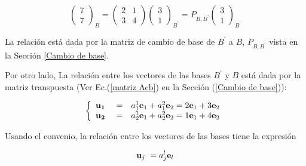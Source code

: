 \begin{example}
\bigskip



$$\left(\begin{array}{c} 7 \\ 7
 \end{array}
 \right)_B=\left(\begin{array}{cc} 2  & 1 \\ 3  &  4
\end{array}
 \right)
\left(\begin{array}{c} 3 \\ 1
 \end{array}
 \right)_{B^\prime}= P_{B,B ^{\prime}}\left(\begin{array}{c} 3 \\ 1
 \end{array}
 \right)_{B^\prime}$$

\bigskip




\bigskip

La relación está dada por la matriz de cambio de base de $B^\prime$ a $B$, $P_{B,B ^{\prime}}$ vista en la  Sección \ref{Cambio de base}.


\bigskip


Por otro lado,  La relación entre los vectores de las bases  $B^\prime$  y $B$ está dada por la matriz transpuesta  (Ver Ec.(\ref{matriz Acb}) en la Sección (\ref{Cambio de base})):



\begin{equation*} \label{rot}
\left\{ \begin{array} {ccl} 
                    \bold{u _1} &\ =&   a_{1}^1\bold{e}_1+a_{1}^2\bold{e}_2 =2\bold{e}_1+3\bold{e}_2   \\
                     \bold{u _2 } &\ = &a_{2}^1\bold{e}_1+ a_{2}^2\bold{e}_2 =1\bold{e}_1+4\bold{e}_2  \\
										\end{array}
           \right.
\end{equation*}

\bigskip


Usando el convenio, la relación entre los vectores de las bases tiene la expresión


 $$ \bold{u}_j~ = a_j^l \bold{e}_l$$

\end{example}



